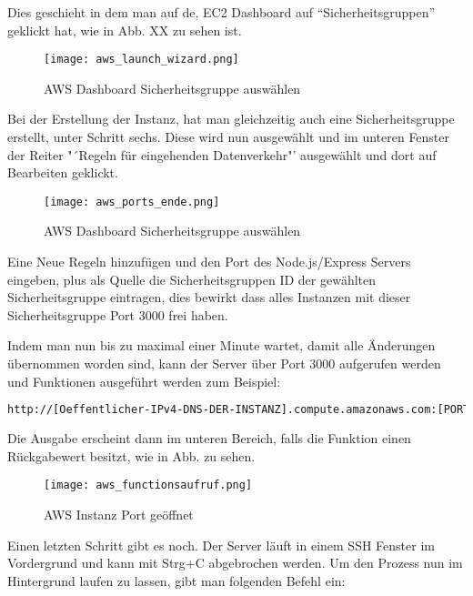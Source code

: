 Dies geschieht in dem man auf de, EC2 Dashboard auf "`Sicherheitsgruppen"' geklickt hat, wie in Abb. XX zu sehen ist. 

\begin{center}
\begin{figure}[h]
    \centering
    \texttt{[image: aws\_launch\_wizard.png]}
    \caption{AWS Dashboard Sicherheitsgruppe auswählen}
\end{figure}
\end{center}

Bei der Erstellung der Instanz, hat man gleichzeitig auch eine Sicherheitsgruppe erstellt, unter Schritt sechs. Diese wird nun ausgewählt und im unteren Fenster der Reiter "´Regeln für eingehenden Datenverkehr"' ausgewählt und dort auf Bearbeiten geklickt.


\begin{center}
\begin{figure}[h]
    \centering
    \texttt{[image: aws\_ports\_ende.png]}
    \caption{AWS Dashboard Sicherheitsgruppe auswählen}
\end{figure}
\end{center}

Eine Neue Regeln hinzufügen und den Port des Node.js/Express Servers eingeben, plus als Quelle die Sicherheitsgruppen ID der gewählten Sicherheitsgruppe eintragen, dies bewirkt dass alles Instanzen mit dieser Sicherheitsgruppe Port 3000 frei haben.

Indem man nun bis zu maximal einer Minute wartet, damit alle Änderungen übernommen worden sind, kann der Server über Port 3000 aufgerufen werden und Funktionen ausgeführt werden zum Beispiel:

\begin{lstlisting}[language=bash]
http://[Oeffentlicher-IPv4-DNS-DER-INSTANZ].compute.amazonaws.com:[PORTNUMMER]/[FUNKTIONS_NAME]
\end{lstlisting}

Die Ausgabe erscheint dann im unteren Bereich, falls die Funktion einen Rückgabewert besitzt, wie in Abb. zu sehen.

\begin{center}
\begin{figure}[h]
    \centering
    \texttt{[image: aws\_functionsaufruf.png]}
    \caption{AWS Instanz Port geöffnet}
\end{figure}
\end{center}

Einen letzten Schritt gibt es noch. Der Server läuft in einem SSH Fenster im Vordergrund und kann mit Strg+C abgebrochen werden. Um den Prozess nun im Hintergrund laufen zu lassen, gibt man folgenden Befehl ein:

